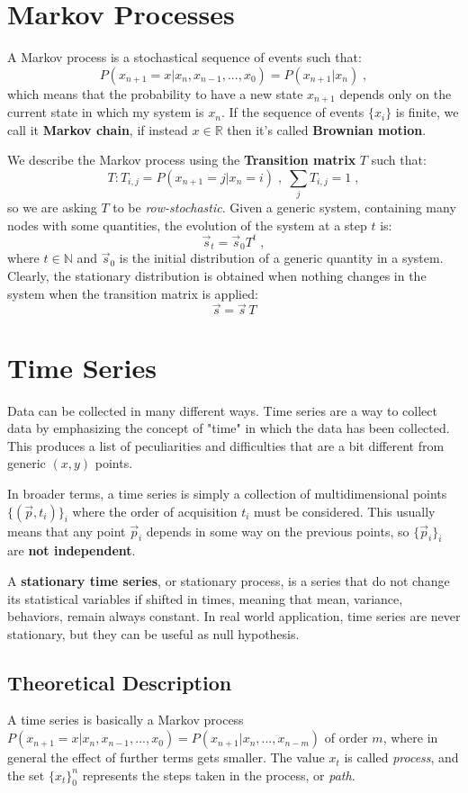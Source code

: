 \documentclass[12pt,a4paper]{article}
\begin{document}
\section{Markov Processes}
A Markov process is a stochastical sequence of events such that:
$$
P(x_{n+1}=x | x_n,x_{n-1},...,x_0) = P(x_{n+1} | x_n) \;,
$$
which means that the probability to have a new state $x_{n+1}$ depends only on the current state in which my system is $x_n$.
If the sequence of events $\{x_i\}$ is finite, we call it \textbf{Markov chain}, if instead $x\in \mathbb{R}$ then it's called \textbf{Brownian motion}.

We describe the Markov process using the \textbf{Transition matrix} $T$ such that:
$$
T : T_{i,j} = P(x_{n+1}=j | x_n = i) \;,\; \sum_{j} T_{i,j} = 1\;,
$$
so we are asking $T$ to be \textit{row-stochastic}.
Given a generic system, containing many nodes with some quantities, the evolution of the system at a step $t$ is:
$$
\vec{s}_t = \vec{s}_0 T^t \;,
$$
where $t\in \mathbb{N}$ and $\vec{s}_0 $ is the initial distribution of a generic quantity in a system.
Clearly, the stationary distribution is obtained when nothing changes in the system when the transition matrix is applied:
$$
\vec{s} = \vec{s}\,T
$$


\section{Time Series}
Data can be collected in many different ways. Time series are a way to collect data by emphasizing the concept of "time" in which the data has been collected. This produces a list of peculiarities and difficulties that are a bit different from generic $(x,y)$ points.

In broader terms, a time series is simply a collection of multidimensional points $\{(\vec{p}, t_i)\}_i$ where the order of acquisition $t_i$ must be considered. This usually means that any point $\vec{p}_i$ depends in some way on the previous points, so $\{\vec{p}_i\}_i$ are \textbf{not independent}.

A \textbf{stationary time series}, or stationary process, is a series that do not change its statistical variables if shifted in times, meaning that mean, variance, behaviors, remain always constant.
In real world application, time series are never stationary, but they can be useful as null hypothesis.

\subsection{Theoretical Description}
A time series is basically a Markov process $P(x_{n+1}=x | x_n,x_{n-1},...,x_0) = P(x_{n+1} | x_n, ..., x_{n-m})$ of order $m$, where in general the effect of further terms gets smaller. The value $x_t$ is called \textit{process}, and the set $\{x_t\}_0^n$ represents the steps taken in the process, or \textit{path}.
\end{document}
